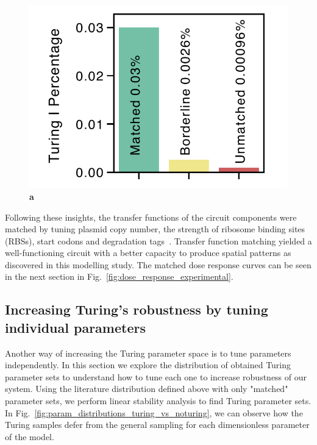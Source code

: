 \begin{figure}[H]
    \centering
    \includegraphics[width=1\textwidth]{chapters/Chapter 2/balancing_robustness}
    \caption[]{\textbf{a} } %
    \label{fig:balancing_robustness}
\end{figure}

Following these insights, the transfer functions of the circuit components were matched by tuning plasmid copy number, the strength of ribosome binding sites (RBSs), start codons and degradation tags~\parencite{Andersen1998, Wang2011,Hecht2017}.
Transfer function matching yielded a well-functioning circuit with a better capacity to produce spatial patterns as discovered in this modelling study.
The matched dose response curves can be seen in the next section in Fig.~\ref{fig:dose_response_experimental}.


\subsection{Increasing Turing's robustness by tuning individual parameters}
Another way of increasing the Turing parameter space is to tune parameters independently.
In this section we explore the distribution of obtained Turing parameter sets to understand how to tune each one to increase robustness of our system.
Using the literature distribution defined above with only "matched" parameter sets, we perform linear stability analysis to find Turing parameter sets.
In Fig.~\ref{fig:param_distributions_turing_vs_noturing}, we can observe how the Turing samples defer from the general sampling for each dimensionless parameter of the model.

